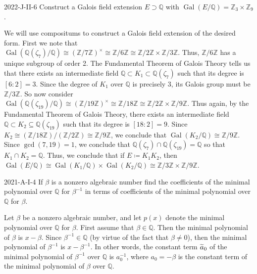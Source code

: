 \documentclass{article}
\begin{document}
	\begin{prb}{2022-J-II-6}
		Construct a Galois field extension $E \supset \mathbb{Q}$ with $\operatorname{Gal}(E/\mathbb{Q}) = \mathbb{Z}_{3} \times \mathbb{Z}_{9}$. 
	\end{prb}
	We will use compositums to construct a Galois field extension of the desired form. First we note that $\operatorname{Gal}(\mathbb{Q}(\zeta_{7})/\mathbb{Q}) \cong (\mathbb{Z}/7\mathbb{Z})^{\times} \cong \mathbb{Z}/6\mathbb{Z} \cong \mathbb{Z}/2\mathbb{Z} \times \mathbb{Z}/3\mathbb{Z}$. Thus, $\mathbb{Z}/6\mathbb{Z}$ has a unique subgroup of order 2. The Fundamental Theorem of Galois Theory tells us that there exists an intermediate field $\mathbb{Q} \subset K_1 \subset \mathbb{Q}(\zeta_7)$ such that its degree is $[6:2] = 3$. Since the degree of $K_1$ over $\mathbb{Q}$ is precisely 3, its Galois group must be $\mathbb{Z}/3\mathbb{Z}$. So now consider $\operatorname{Gal}(\mathbb{Q}(\zeta_{19})/\mathbb{Q}) \cong (\mathbb{Z}/19\mathbb{Z})^{\times} \cong \mathbb{Z}/18\mathbb{Z} \cong \mathbb{Z}/2\mathbb{Z} \times \mathbb{Z}/9\mathbb{Z}$. Thus again, by the Fundamental Theorem of Galois Theory, there exists an intermediate field $\mathbb{Q} \subset K_2 \subseteq \mathbb{Q}(\zeta_{19})$ such that its degree is $[18:2] = 9$. Since $K_2 \cong (\mathbb{Z}/18\mathbb{Z})/(\mathbb{Z}/2\mathbb{Z}) \cong \mathbb{Z}/9\mathbb{Z}$, we conclude that $\operatorname{Gal}(K_2/\mathbb{Q})\cong \mathbb{Z}/9\mathbb{Z}$. Since $\gcd(7,19) = 1$, we conclude that $\mathbb{Q}(\zeta_{7}) \cap \mathbb{Q}(\zeta_{19}) = \mathbb{Q}$ so that $K_{1} \cap K_{2} = \mathbb{Q}$. Thus, we conclude that if $E \coloneqq K_{1} K_{2}$, then $\operatorname{Gal}(E/\mathbb{Q}) \cong \operatorname{Gal}(K_1/\mathbb{Q}) \times \operatorname{Gal}(K_2/\mathbb{Q}) \cong \mathbb{Z}/3\mathbb{Z} \times \mathbb{Z}/9\mathbb{Z}$. 
	
	\begin{prb}{2021-A-I-4}
		If $\beta$ is a nonzero algebraic number find the coefficients of the minimal polynomial over $\mathbb{Q}$ for $\beta^{-1}$ in terms of coefficients of the minimal polynomial over $\mathbb{Q}$ for $\beta$. 
	\end{prb}
	Let $\beta$ be a nonzero algebraic number, and let $p(x)$ denote the minimal polynomial over $\mathbb{Q}$ for $\beta$. First assume that $\beta \in \mathbb{Q}$. Then the minimal polynomial of $\beta$ is $x - \beta$. Since $\beta^{-1} \in \mathbb{Q}$ (by virtue of the fact that $\beta \neq 0$), then the minimal polynomial of $\beta^{-1}$ is $x - \beta^{-1}$. In other words, the constant term $\widetilde{a}_{0}$ of the minimal polynomial of $\beta^{-1}$ over $\mathbb{Q}$ is $a_{0}^{-1}$, where $a_{0} =-\beta$ is the constant term of the minimal polynomial of $\beta$ over $\mathbb{Q}$. 
	
\end{document}
